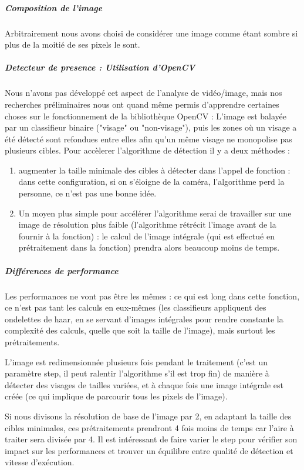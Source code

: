 			\subparagraph{Composition de l'image}
					Arbitrairement nous avons choisi de considérer une image comme étant sombre si plus de la moitié de ses pixels le sont.
					
			\subparagraph{Detecteur de presence : Utilisation d'OpenCV}
				Nous n'avons pas développé cet aspect de l'analyse de vidéo/image, mais nos recherches préliminaires nous ont quand même permis d'apprendre certaines choses sur le fonctionnement de la bibliothèque OpenCV : L'image est balayée par un classifieur binaire ("visage" ou "non-visage"), puis les zones où un visage a été détecté sont refondues entre elles afin qu'un même visage ne monopolise pas plusieurs cibles. 
				Pour accèlerer l'algorithme de détection il y a deux méthodes :
				\begin{enumerate}
					\item augmenter la taille minimale des cibles à détecter dans l'appel de fonction : dans cette configuration, si on s'éloigne de la caméra, l'algorithme perd la personne, ce n'est pas une bonne idée.
					\item Un moyen plus simple pour accélérer l'algorithme serai de travailler sur une image de résolution plus faible (l'algorithme rétrécit l'image avant de la fournir à la fonction) : le calcul de l'image intégrale (qui est effectué en prétraitement dans la fonction) prendra alors beaucoup moins de temps.
				\end{enumerate}
		
			\subparagraph{Différences de performance}
				Les performances ne vont pas être les mêmes : ce qui est long dans cette fonction, ce n'est pas tant les calculs en eux-mêmes (les classifieurs appliquent des ondelettes de haar, en se servant d'images intégrales pour rendre constante la complexité des calculs, quelle que soit la taille de l'image), mais surtout les prétraitements.
			
			L'image est redimensionnée plusieurs fois pendant le traitement (c'est un paramètre step, il peut ralentir l'algorithme s'il est trop fin) de manière à détecter des visages de tailles variées, et à chaque fois une image intégrale est créée (ce qui implique de parcourir tous les pixels de l'image).
			
			Si nous divisons la résolution de base de l'image  par 2, en adaptant la taille des cibles minimales, ces prétraitements prendront 4 fois moins de temps car l'aire à traiter sera divisée par 4. Il est intéressant de faire varier le step pour vérifier son impact sur les performances et trouver un équilibre entre qualité de détection et vitesse d'exécution.
			
